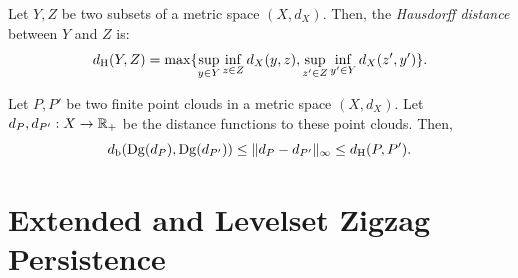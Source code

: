 \begin{defin}
Let $Y,Z$ be two subsets of a metric space $(X,d_X)$.
Then, the {\em Hausdorff distance} between $Y$ and $Z$ is:
\begin{equation}
d_{\rm H}(Y,Z)=\max\{\sup_{y\in Y}\inf_{z\in Z}d_X(y,z),\sup_{z'\in Z}\inf_{y'\in Y}d_X(z',y')\}.
\end{equation}  
\end{defin}

\begin{thm}\label{th:StabCech}
Let $P,P'$ be two finite point clouds in a metric space $(X,d_X)$. 
Let $d_P,d_{P'}:X\rightarrow\mathbb{R}_+$ be the distance functions to these point clouds.
Then, $$d_{\rm b}(\mathrm{Dg}(d_P),\mathrm{Dg}(d_{P'}))\leq \|d_P-d_{P'}\|_\infty \leq d_{\rm H}(P,P').$$
\end{thm}





\section{Extended and Levelset Zigzag Persistence}\label{sec:extendedzigzag}

